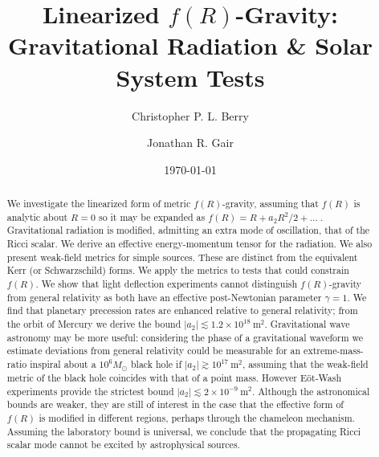 \documentclass[aps,prd,amsfonts,amssymb,amsmath,nofootinbib,reprint,showpacs]{revtex4-1}
\newcommand{\units}[1]{\ensuremath{~\mathrm{#1}}}
\begin{document}

\title{Linearized $f(R)$-Gravity: Gravitational Radiation \& Solar System Tests}

\author{Christopher P. L. Berry}
\author{Jonathan R. Gair}

\date{\today}

\begin{abstract}
We investigate the linearized form of metric $f(R)$-gravity, assuming that $f(R)$ is analytic about $R = 0$ so it may be expanded as $f(R) = R + a_2R^2/2 + \ldots\;$. Gravitational radiation is modified, admitting an extra mode of oscillation, that of the Ricci scalar. We derive an effective energy-momentum tensor for the radiation. We also present weak-field metrics for simple sources. These are distinct from the equivalent Kerr (or Schwarzschild) forms. We apply the metrics to tests that could constrain $f(R)$. We show that light deflection experiments cannot distinguish $f(R)$-gravity from general relativity as both have an effective post-Newtonian parameter $\gamma = 1$. We find that planetary precession rates are enhanced relative to general relativity; from the orbit of Mercury we derive the bound $|a_2| \lesssim 1.2 \times 10^{18}\units{m^2}$. Gravitational wave astronomy may be more useful: considering the phase of a gravitational waveform we estimate deviations from general relativity could be measurable for an extreme-mass-ratio inspiral about a $10^6 M_\odot$ black hole if $|a_2| \gtrsim 10^{17}\units{m^2}$, assuming that the weak-field metric of the black hole coincides with that of a point mass. However E\"ot-Wash experiments provide the strictest bound $|a_2| \lesssim 2 \times 10^{-9}\units{m^2}$. Although the astronomical bounds are weaker, they are still of interest in the case that the effective form of $f(R)$ is modified in different regions, perhaps through the chameleon mechanism. Assuming the laboratory bound is universal, we conclude that the propagating Ricci scalar mode cannot be excited by astrophysical sources.
\end{abstract}


\maketitle
\end{document}
